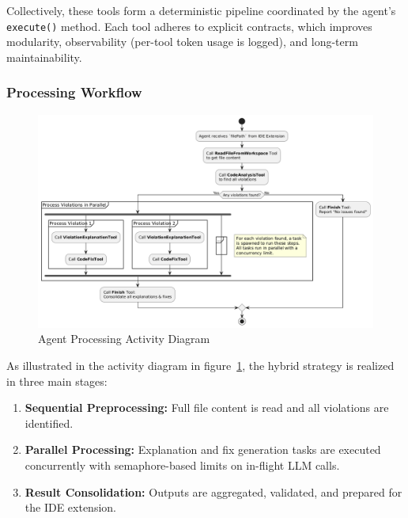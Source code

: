 \begin{spacing}{1.2}
\noindent Collectively, these tools form a deterministic pipeline coordinated by the agent’s \texttt{execute()} method. Each tool adheres to explicit contracts, which improves modularity, observability (per-tool token usage is logged), and long-term maintainability.


\subsubsection{Processing Workflow}

\begin{figure}[H]
    \centering
    \includegraphics[scale=0.5]{images/activity_diagram.png}
    \caption{Agent Processing Activity Diagram}
    \label{fig:agent_activity}
\end{figure}

As illustrated in the activity diagram in figure~\ref{fig:agent_activity}, the hybrid strategy is realized in three main stages:
\begin{enumerate}
    \item \textbf{Sequential Preprocessing:} Full file content is read and all violations are identified.
    \item \textbf{Parallel Processing:} Explanation and fix generation tasks are executed concurrently with semaphore-based 
    limits on in-flight LLM calls.
    \item \textbf{Result Consolidation:} Outputs are aggregated, validated, and prepared for the IDE extension.
\end{enumerate}




\end{spacing}
